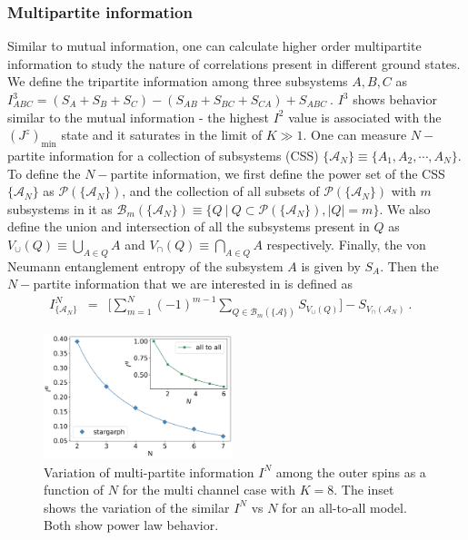 \documentclass[reprint,prb,superscriptaddress]{revtex4-2}
\begin{document}
\subsubsection{Multipartite information}
\noindent Similar to mutual information, one can calculate higher order multipartite information to study the nature of correlations present in different ground states. We define the tripartite information among three subsystems $A,B,C$ as $I^3_{ABC} = (S_A+S_B+S_C)-(S_{AB}+S_{BC}+S_{CA})+S_{ABC}~$. \(I^3\) shows behavior similar to the mutual information - the highest \(I^2\) value is associated with the $\left(J^z\right)_\mathrm{min}$ state and it saturates in the limit of $K\gg 1$. One can measure $N-$partite information for a collection of subsystems (CSS) $\{\mathcal{A}_N\}\equiv\{A_1,A_2,\cdots,A_N\}$. To define the $N-$partite information, we first define the power set of the CSS $\{\mathcal{A}_N\}$ as $\mathcal{P}(\{\mathcal{A}_{N}\})$, and the collection of all subsets of $\mathcal{P}(\{\mathcal{A}_{N}\})$ with $m$ subsystems in it as $\mathcal{B}_m(\{\mathcal{A}_N\})\equiv \{ Q~| ~Q\subset \mathcal{P}(\{\mathcal{A}_{N}\}), |Q|=m \}$. We also define the union and intersection of all the subsystems present in $Q$ as ${V}_{\cup}({Q})\equiv \bigcup_{A\in Q} A$ and ${V}_{\cap}({Q})\equiv \bigcap_{A\in Q} A$ respectively. Finally, the von Neumann entanglement entropy of the subsystem $A$ is given by $S_{A} $. Then the $N-$partite information that we are interested in is defined as
\begin{eqnarray}
I^{N}_{\{\mathcal{A}_N\}} &=& \bigg[\displaystyle\sum_{m=1}^{N} (-1)^{m-1} \displaystyle\sum_{Q \in \mathcal{B}_m(\{\mathcal{A}\})} S_{V_{\cup}({Q})} \bigg]- S_{V_{\cap}(\mathcal{A}_N)}~.~~~~
\label{eq:I_N_definition}
\end{eqnarray}
\begin{figure}
\includegraphics[width=0.49\textwidth]{plt/2022_IN_vs_N_K8.png}
\caption{Variation of multi-partite information $I^N$ among the outer spins as a function of $N$ for the multi channel case with $K=8$. The inset shows the variation of the similar $I^N$ vs $N$ for an all-to-all model. Both show power law behavior.}
\label{fig:Im_vs_m}
\end{figure}
\end{document}

